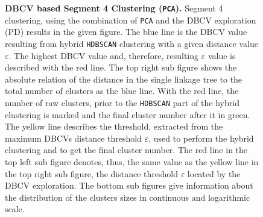 \begin{figure}[!hbt]
\begin{subfigure}[b]{0.475\textwidth}
    \end{subfigure}
    \caption[\Acrshort{DBCV} based Segment 4 Clustering (\texttt{PCA})]{\textbf{\Acrshort{DBCV} based Segment 4 Clustering (\texttt{PCA}).} Segment 4 clustering, using the combination of \texttt{PCA} and the \gls{DBCV} exploration (PD) results in the given figure. The blue line is the \gls{DBCV} value resulting from hybrid \texttt{HDBSCAN} clustering with a given distance value $\varepsilon$. The highest \gls{DBCV} value and, therefore, resulting $\varepsilon$ value is described with the red line. The top right sub figure shows the absolute relation of the distance in the single linkage tree to the total number of clusters as the blue line. With the red line, the number of raw clusters, prior to the \texttt{HDBSCAN} part of the hybrid clustering is marked and the final cluster number after it in green. The yellow line describes the threshold, extracted from the maximum \glspl{DBCV} distance threshold $\varepsilon$, used to perform the hybrid clustering and to get the final cluster number. The red line in the top left sub figure denotes, thus, the same value as the yellow line in the top right sub figure, the distance threshold $\varepsilon$ located by the \gls{DBCV} exploration. The bottom sub figures give information about the distribution of the clusters sizes in continuous and logarithmic scale.}
    \label{fig:PCA_Cluster_DBCV_4}
\end{figure}

